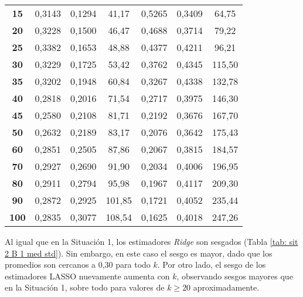 \documentclass[a4paper,12pt]{report}
\begin{document}
\begin{table}[H]
\begin{tabular}{c|ccc|ccc}
\textbf{15}  & 0,3143 & 0,1294 & \hspace{0.05cm} 41,17  & 0,5265 & 0,3409 & \hspace{0.05cm} 64,75  \\
\textbf{20}  & 0,3228 & 0,1500 & \hspace{0.05cm} 46,47  & 0,4688 & 0,3714 & \hspace{0.05cm} 79,22  \\
\textbf{25}  & 0,3382 & 0,1653 & \hspace{0.05cm} 48,88  & 0,4377 & 0,4211 & \hspace{0.05cm} 96,21  \\
\textbf{30}  & 0,3229 & 0,1725 & \hspace{0.05cm} 53,42  & 0,3762 & 0,4345 & 115,50 \\
\textbf{35}  & 0,3202 & 0,1948 & \hspace{0.05cm} 60,84  & 0,3267 & 0,4338 & 132,78 \\
\textbf{40}  & 0,2818 & 0,2016 & \hspace{0.05cm} 71,54  & 0,2717 & 0,3975 & 146,30 \\
\textbf{45}  & 0,2580 & 0,2108 & \hspace{0.05cm} 81,71  & 0,2192 & 0,3676 & 167,70 \\
\textbf{50}  & 0,2632 & 0,2189 & \hspace{0.05cm} 83,17  & 0,2076 & 0,3642 & 175,43 \\
\textbf{60}  & 0,2851 & 0,2505 & \hspace{0.05cm} 87,86  & 0,2067 & 0,3815 & 184,57 \\
\textbf{70}  & 0,2927 & 0,2690 & \hspace{0.05cm} 91,90  & 0,2034 & 0,4006 & 196,95 \\
\textbf{80}  & 0,2911 & 0,2794 & \hspace{0.05cm} 95,98  & 0,1967 & 0,4117 & 209,30 \\
\textbf{90}  & 0,2872 & 0,2925 & 101,85 & 0,1721 & 0,4052 & 235,44 \\
\textbf{100} & 0,2835 & 0,3077 & 108,54 & 0,1625 & 0,4018 & 247,26
\end{tabular}
\end{table}

Al igual que en la Situación 1, los estimadores \textit{Ridge} son sesgados (Tabla \ref{tab: sit 2 B 1 med std}). Sin embargo, en este caso el sesgo es mayor, dado que los promedios son cercanos a 0,30 para todo $k$. Por otro lado, el sesgo de los estimadores LASSO nuevamente aumenta con $k$, observando sesgos mayores que en la Situación 1, sobre todo para valores de $k \geq 20$ aproximadamente.
\end{document}
